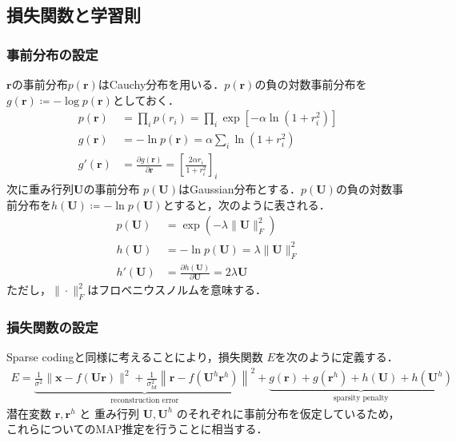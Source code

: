 \subsection{損失関数と学習則}
\subsubsection{事前分布の設定}
$\mathbf{r}$の事前分布$p(\mathbf{r})$はCauchy分布を用いる．$p(\mathbf{r})$の負の対数事前分布を$g(\mathbf{r})\coloneqq -\log p(\mathbf{r})$としておく．
\begin{align}
p(\mathbf{r})&=\prod_i p(r_i)=\prod_i \exp\left[-\alpha \ln(1+r_i^2)\right]\\
g(\mathbf{r})&=-\ln p(\mathbf{r})=\alpha \sum_i \ln(1+r_i^2)\\
g'(\mathbf{r})&=\frac{\partial g(\mathbf{r})}{\partial \mathbf{r}}=\left[\frac{2\alpha r_i}{1+r_i^2}\right]_i
\end{align}
次に重み行列$\mathbf{U}$の事前分布 $p(\mathbf{U})$はGaussian分布とする．$p(\mathbf{U})$の負の対数事前分布を$h(\mathbf{U})\coloneqq -\ln p(\mathbf{U})$とすると，次のように表される．
\begin{align}
p(\mathbf{U})&=\exp(-\lambda\|\mathbf{U}\|^2_F)\\
h(\mathbf{U})&=-\ln p(\mathbf{U})=\lambda\|\mathbf{U}\|^2_F\\
h'(\mathbf{U})&=\frac{\partial h(\mathbf{U})}{\partial \mathbf{U}}=2\lambda \mathbf{U}
\end{align}
ただし，$\|\cdot \| _ F^2$はフロベニウスノルムを意味する．
\subsubsection{損失関数の設定}
Sparse codingと同様に考えることにより，損失関数 $E$を次のように定義する．
\begin{align}
E=\underbrace{\frac{1}{\sigma^{2}}\|\mathbf{x}-f(\mathbf{U} \mathbf{r})\|^2+\frac{1}{\sigma_{t d}^{2}}\left\|\mathbf{r}-f(\mathbf{U}^h \mathbf{r}^h)\right\|^2}_{\text{reconstruction error}}+\underbrace{g(\mathbf{r})+g(\mathbf{r}^{h})+h(\mathbf{U})+h(\mathbf{U}^h)}_{\text{sparsity penalty}}
\end{align}
潜在変数 $\mathbf{r}, \mathbf{r}^h$ と 重み行列 $\mathbf{U}, \mathbf{U}^h$ のそれぞれに事前分布を仮定しているため，これらについてのMAP推定を行うことに相当する．
